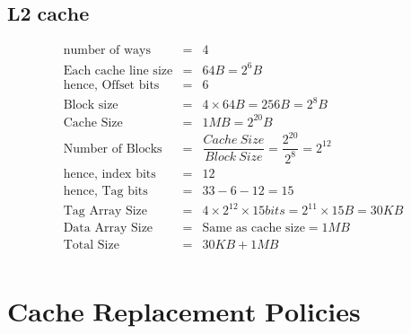 \documentclass{tufte-handout}
\begin{document}
	\subsection{$\textbf{L2 cache}$}
		\begin{eqnarray*}
			\mbox{number of ways} &=& 4   \\
			\mbox{Each cache line size} &=& 64B = 2^6 B  \\
			\mbox{hence, Offset bits} &=& 6 \\
			\mbox{Block size} &=& 4\times 64B = 256 B  = 2^8 B \\
			\mbox{Cache Size} &=& 1MB = 2^{20}B   \\
			\mbox{Number of Blocks} &=& \dfrac{Cache\ Size}{Block\ Size}   = \dfrac{2^{20}}{2^8} = 2^{12}\\
			\mbox{hence, index bits} &=& 12  \\
			\mbox{hence, Tag bits} &=& 33 - 6 - 12 = 15  \\
			\mbox{Tag Array Size} &=& 4 \times 2^{12} \times 15 bits= 2^{11} \times 15 B = 30 KB\\
			\mbox{Data Array Size} &=& \mbox{Same as cache size} = 1MB \\
			\mbox{Total Size} &=& 30KB + 1MB \\
		\end{eqnarray*}

\section{$\textbf{Cache Replacement Policies}$}
\end{document}
